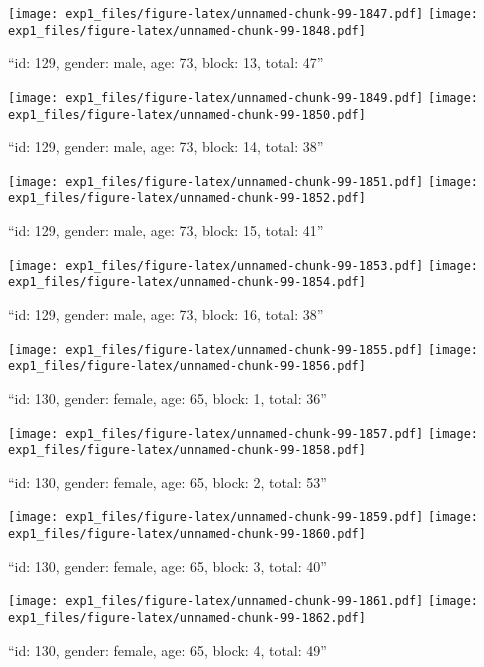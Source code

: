 \documentclass[,]{article}
\begin{document}
\texttt{[image: exp1\_files/figure-latex/unnamed-chunk-99-1847.pdf]}
\texttt{[image: exp1\_files/figure-latex/unnamed-chunk-99-1848.pdf]}

\newpage
[1] 

``id: 129, gender: male, age: 73, block: 13, total: 47''

\texttt{[image: exp1\_files/figure-latex/unnamed-chunk-99-1849.pdf]}
\texttt{[image: exp1\_files/figure-latex/unnamed-chunk-99-1850.pdf]}

\newpage
[1] 

``id: 129, gender: male, age: 73, block: 14, total: 38''

\texttt{[image: exp1\_files/figure-latex/unnamed-chunk-99-1851.pdf]}
\texttt{[image: exp1\_files/figure-latex/unnamed-chunk-99-1852.pdf]}

\newpage
[1] 

``id: 129, gender: male, age: 73, block: 15, total: 41''

\texttt{[image: exp1\_files/figure-latex/unnamed-chunk-99-1853.pdf]}
\texttt{[image: exp1\_files/figure-latex/unnamed-chunk-99-1854.pdf]}

\newpage
[1] 

``id: 129, gender: male, age: 73, block: 16, total: 38''

\texttt{[image: exp1\_files/figure-latex/unnamed-chunk-99-1855.pdf]}
\texttt{[image: exp1\_files/figure-latex/unnamed-chunk-99-1856.pdf]}

\newpage
[1] 

``id: 130, gender: female, age: 65, block: 1, total: 36''

\texttt{[image: exp1\_files/figure-latex/unnamed-chunk-99-1857.pdf]}
\texttt{[image: exp1\_files/figure-latex/unnamed-chunk-99-1858.pdf]}

\newpage
[1] 

``id: 130, gender: female, age: 65, block: 2, total: 53''

\texttt{[image: exp1\_files/figure-latex/unnamed-chunk-99-1859.pdf]}
\texttt{[image: exp1\_files/figure-latex/unnamed-chunk-99-1860.pdf]}

\newpage
[1] 

``id: 130, gender: female, age: 65, block: 3, total: 40''

\texttt{[image: exp1\_files/figure-latex/unnamed-chunk-99-1861.pdf]}
\texttt{[image: exp1\_files/figure-latex/unnamed-chunk-99-1862.pdf]}

\newpage
[1] 

``id: 130, gender: female, age: 65, block: 4, total: 49''
\end{document}
